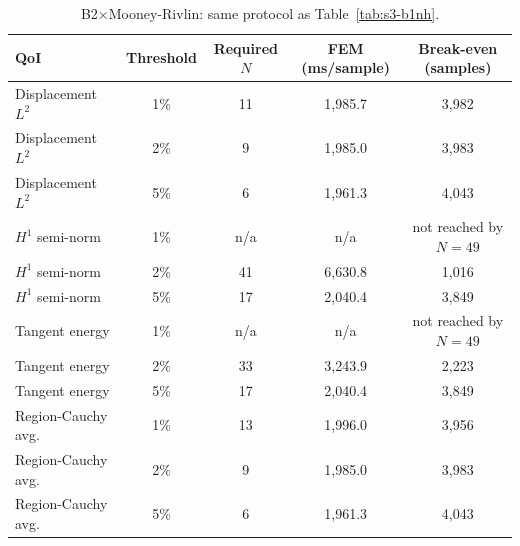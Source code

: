 \documentclass[11pt]{article}
\begin{document}
\begin{table}[h]
\centering
\caption{B2$\times$Mooney-Rivlin: same protocol as Table~\ref{tab:s3-b1nh}.}
\label{tab:s3-b2mr}
\small
\begin{tabular}{lcccc}
\toprule
QoI & Threshold & Required $N$ & FEM (ms/sample) & Break-even (samples) \\
\midrule
Displacement $L^2$  & 1\% & 11  & 1{,}985.7 & 3{,}982 \\
Displacement $L^2$  & 2\% & 9   & 1{,}985.0 & 3{,}983 \\
Displacement $L^2$  & 5\% & 6   & 1{,}961.3 & 4{,}043 \\
$H^1$ semi-norm     & 1\% & n/a & n/a       & not reached by $N{=}49$ \\
$H^1$ semi-norm     & 2\% & 41  & 6{,}630.8 & 1{,}016 \\
$H^1$ semi-norm     & 5\% & 17  & 2{,}040.4 & 3{,}849 \\
Tangent energy      & 1\% & n/a & n/a       & not reached by $N{=}49$ \\
Tangent energy      & 2\% & 33  & 3{,}243.9 & 2{,}223 \\
Tangent energy      & 5\% & 17  & 2{,}040.4 & 3{,}849 \\
Region-Cauchy avg.\ & 1\% & 13  & 1{,}996.0 & 3{,}956 \\
Region-Cauchy avg.\ & 2\% & 9   & 1{,}985.0 & 3{,}983 \\
Region-Cauchy avg.\ & 5\% & 6   & 1{,}961.3 & 4{,}043 \\
\bottomrule
\end{tabular}
\end{table}
\end{document}
